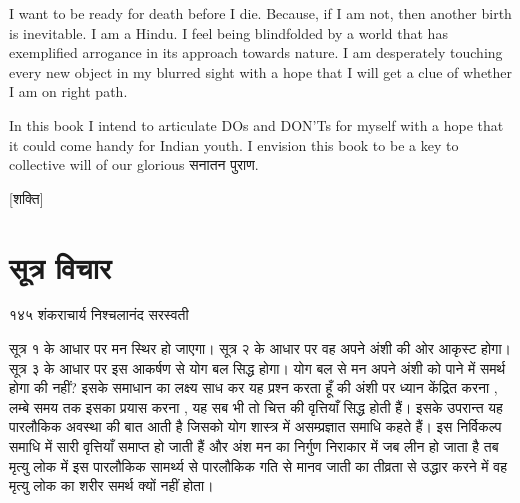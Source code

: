 \documentclass[oneside,12pt]{book} %
\begin{document}
I want to be ready for death before I die. Because, if I am not, then another birth is inevitable. 
I am a Hindu. I feel being blindfolded by a world that has exemplified arrogance in its approach towards nature. 
I am desperately touching every new object in my blurred sight with a hope that I will get a clue of whether I am on right path.

In this book I intend to articulate DOs and DON'Ts for myself with a hope that it could come handy for Indian youth. 
I envision this book to be a key to collective will of our glorious सनातन पुराण.







[शक्ति]

\chapter{सूत्र विचार}


१४५ शंकराचार्य निश्चलानंद सरस्वती 


सूत्र १ के आधार पर मन स्थिर हो जाएगा। सूत्र २ के आधार पर वह अपने अंशी की ओर आकृस्ट होगा। सूत्र ३ के आधार पर इस आकर्षण से योग बल सिद्ध होगा। योग बल से मन अपने अंशी को पाने में समर्थ होगा की नहीं? इसके समाधान का लक्ष्य साध कर यह प्रश्न करता हूँ की अंशी पर ध्यान केंद्रित करना , लम्बे समय तक इसका प्रयास करना , यह सब भी तो चित्त की वृत्तियाँ सिद्ध होती हैं। इसके उपरान्त यह पारलौकिक अवस्था की बात आती है जिसको योग शास्त्र में असम्प्रज्ञात समाधि कहते हैं। इस निर्विकल्प समाधि में सारी वृत्तियाँ समाप्त हो जाती हैं और अंश मन का निर्गुण निराकार में जब लीन हो जाता है तब मृत्यु लोक में इस पारलौकिक सामर्थ्य से पारलौकिक गति से मानव जाती का तीव्रता से उद्धार करने में वह मृत्यु लोक का शरीर समर्थ क्यों नहीं होता।
\end{document}
